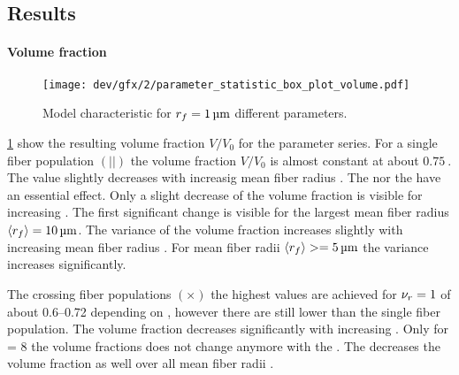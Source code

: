 \subsection{Results}
% 
\paragraph{Volume fraction}
% 
\begin{figure}[p]
\centering
\texttt{[image: dev/gfx/2/parameter\_statistic\_box\_plot\_volume.pdf]}
\caption[Model characteristics]{Model characteristic for $\fiberRadius = \SI{1}{\micro\meter}$ different parameters.}
\label{fig:psbp1}
\end{figure}
% 
\cref{fig:psbp1} show the resulting volume fraction $V/V_0$ for the parameter series.
For a single fiber population $(||)$ the volume fraction $V/V_0$ is almost constant at about $\SI{0.75}{}$.
The value slightly decreases with increasig mean fiber radius \fiberRadiusMean{}.
The \segLengthFactor{} nor the \segRadiusFactor{} have an essential effect.
Only a slight decrease of the volume fraction is visible for increasing \segLengthFactor{}.
The first significant change is visible for the largest mean fiber radius $\fiberRadiusMean=\SI{10}{\micro\meter}$.
The variance of the volume fraction increases slightly with increasing mean fiber radius \fiberRadiusMean{}.
For mean fiber radii $\fiberRadiusMean >= \SI{5}{\micro\meter}$ the variance increases significantly.
\par
% 
The crossing fiber populations $(\times)$ the highest values are achieved for $\textnormal{$\nu_{r}$}=\SI{1}{}$ of about \numrange{0.6}{0.72}{} depending on \fiberRadiusMean{}, however there are still lower than the single fiber population.
The volume fraction decreases significantly with increasing \segRadiusFactor{}.
Only for \segLengthFactor{} = 8 the volume fractions does not change anymore with the \segRadiusFactor{}.
The \segLengthFactor{} decreases the volume fraction as well over all mean fiber radii \fiberRadiusMean{}.
% 
